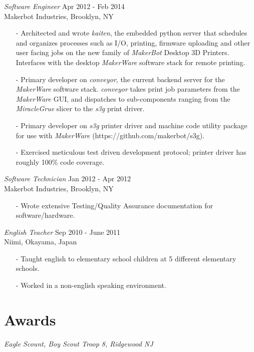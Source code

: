 \documentclass{res} %
\begin{document}
\begin{resume}
{\sl Software Engineer} \hfill Apr 2012 - Feb 2014 \\
Makerbot Industries, Brooklyn, NY
\begin{itemize}
\item[-] Architected and wrote \textit{kaiten}, the embedded python server that schedules and organizes processes such as I/O, printing, firmware uploading and other user facing jobs on the new family of \textit{MakerBot} Desktop 3D Printers.  Interfaces with the desktop \textit{MakerWare} software stack for remote printing.
\item[-] Primary developer on \textit{conveyor}, the current backend server for the \textit{MakerWare} software stack.  \textit{conveyor} takes print job parameters from the \textit{MakerWare} GUI, and dispatches to sub-components ranging from the \textit{MiracleGrue} slicer to the \textit{s3g} print driver.
\item[-] Primary developer on \textit{s3g} printer driver and machine code utility package for use with \textit{MakerWare} (https://github.com/makerbot/s3g).
\item[-] Exercised meticulous test driven development protocol; printer driver has roughly 100\% code coverage.
\end{itemize}

{\sl Software Technician} \hfill Jan 2012 - Apr 2012 \\
Makerbot Industries, Brooklyn, NY
\begin{itemize}
\item[-] Wrote extensive Testing/Quality Assurance documentation for software/hardware.
\end{itemize}

{\sl English Teacher} \hfill Sep 2010 - June 2011\\
Niimi, Okayama, Japan
\begin{itemize}
\item[-] Taught english to elementary school children at 5 different elementary schools.
\item[-] Worked in a non-english speaking environment.
\end{itemize}


\section{Awards} 

{\sl Eagle Scount, Boy Scout Troop 8, Ridgewood NJ} \\

\end{resume}
\end{document}
